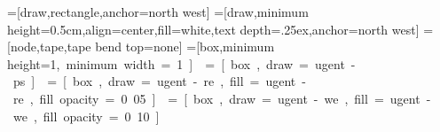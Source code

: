 \usepackage{amsmath}
\usepackage{tikz}
\usepackage{xcolor}

\usetikzlibrary{shapes,arrows,positioning,backgrounds,calc,intersections,calc}


\newlength{\unit}
\setlength{\unit}{0.75cm}

=[draw,rectangle,anchor=north west]
=[draw,minimum height=0.5cm,align=center,fill=white,text depth=.25ex,anchor=north west]
=[node,tape,tape bend top=none]
=[box,minimum height=1\unit,minimum width=1\unit]


=[box,draw=ugent-ps]
=[box,draw=ugent-re,fill=ugent-re,fill opacity=0.05]
=[box,draw=ugent-we,fill=ugent-we,fill opacity=0.10]
